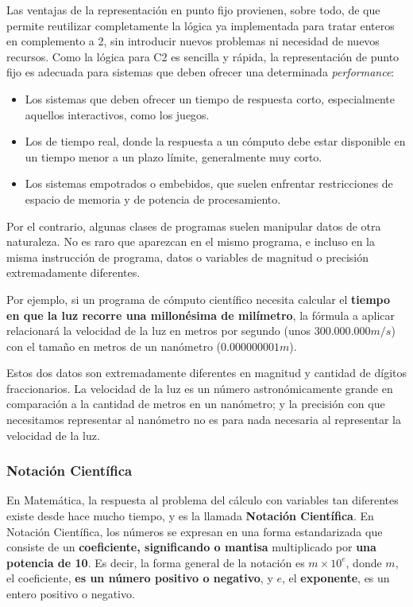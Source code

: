 \documentclass[spanish,A4,]{article}
\begin{document}
Las ventajas de la representación en punto fijo provienen, sobre todo,
de que permite reutilizar completamente la lógica ya implementada para
tratar enteros en complemento a 2, sin introducir nuevos problemas ni
necesidad de nuevos recursos. Como la lógica para C2 es sencilla y
rápida, la representación de punto fijo es adecuada para sistemas que
deben ofrecer una determinada \emph{performance}:

\begin{itemize}
\itemsep1pt\parskip0pt
\item
  Los sistemas que deben ofrecer un tiempo de respuesta corto,
  especialmente aquellos interactivos, como los juegos.
\item
  Los de tiempo real, donde la respuesta a un cómputo debe estar
  disponible en un tiempo menor a un plazo límite, generalmente muy
  corto.
\item
  Los sistemas empotrados o embebidos, que suelen enfrentar
  restricciones de espacio de memoria y de potencia de procesamiento.
\end{itemize}

Por el contrario, algunas clases de programas suelen manipular datos de
otra naturaleza. No es raro que aparezcan en el mismo programa, e
incluso en la misma instrucción de programa, datos o variables de
magnitud o precisión extremadamente diferentes.

Por ejemplo, si un programa de cómputo científico necesita calcular el
\textbf{tiempo en que la luz recorre una millonésima de milímetro}, la
fórmula a aplicar relacionará la velocidad de la luz en metros por
segundo (unos $300.000.000 m/s$) con el tamaño en metros de un nanómetro
($0.000000001 m$).

Estos dos datos son extremadamente diferentes en magnitud y cantidad de
dígitos fraccionarios. La velocidad de la luz es un número
astronómicamente grande en comparación a la cantidad de metros en un
nanómetro; y la precisión con que necesitamos representar al nanómetro
no es para nada necesaria al representar la velocidad de la luz.

\subsubsection{Notación Científica}\label{notaciuxf3n-cientuxedfica}

En Matemática, la respuesta al problema del cálculo con variables tan
diferentes existe desde hace mucho tiempo, y es la llamada
\textbf{Notación Científica}. En Notación Científica, los números se
expresan en una forma estandarizada que consiste de un
\textbf{coeficiente, significando o mantisa} multiplicado por
\textbf{una potencia de 10}. Es decir, la forma general de la notación
es $m \times 10^e$, donde $m$, el coeficiente, \textbf{es un número
positivo o negativo}, y $e$, el \textbf{exponente}, es un entero
positivo o negativo.
\end{document}
